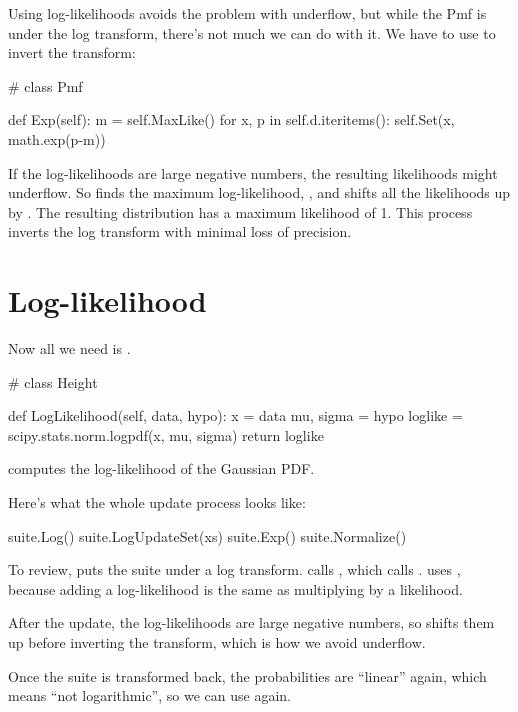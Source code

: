 \documentclass[12pt]{book}
\theoremstyle{exercise}
\begin{document}
Using log-likelihoods avoids the problem with underflow, but while
the Pmf is under the log transform, there's not much we can do with
it.  We have to use  to invert the transform:

\begin{code}
# class Pmf

    def Exp(self):
        m = self.MaxLike()
        for x, p in self.d.iteritems():
            self.Set(x, math.exp(p-m))
\end{code}

If the log-likelihoods are large negative numbers, the resulting
likelihoods might underflow.  So  finds the maximum
log-likelihood, , and shifts all the likelihoods up by .
The resulting distribution has a maximum likelihood of 1.  This
process inverts the log transform with minimal loss of precision.


\section{Log-likelihood}

Now all we need is .

\begin{code}
# class Height

    def LogLikelihood(self, data, hypo):
        x = data
        mu, sigma = hypo
        loglike = scipy.stats.norm.logpdf(x, mu, sigma)
        return loglike
\end{code}

 computes the log-likelihood of the
Gaussian PDF.


Here's what the whole update process looks like:

\begin{code}
    suite.Log()
    suite.LogUpdateSet(xs)
    suite.Exp()
    suite.Normalize()
\end{code}

To review,  puts the suite under a log transform.
 calls , which calls
.   uses ,
because adding a log-likelihood is the same as multiplying
by a likelihood.

After the update, the log-likelihoods are large negative
numbers, so  shifts them up before inverting the
transform, which is how we avoid underflow.

Once the suite is transformed back, the probabilities
are ``linear'' again, which means ``not logarithmic'',
so we can use  again.
\end{document}
